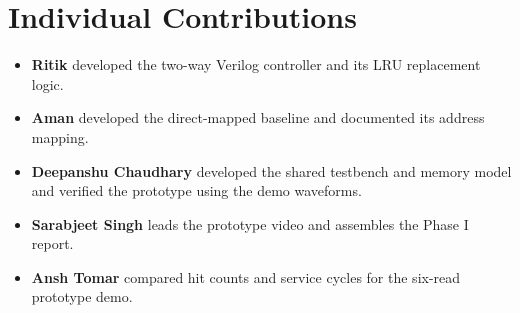 \section{Individual Contributions}
\begin{itemize}
\item \textbf{Ritik} developed the two-way Verilog controller and its LRU
replacement logic.
\item \textbf{Aman} developed the direct-mapped baseline and documented
its address mapping.
\item \textbf{Deepanshu Chaudhary} developed the shared testbench and memory model
and verified the prototype using the demo waveforms.
\item \textbf{Sarabjeet Singh} leads the prototype video and assembles the
Phase I report.
\item \textbf{Ansh Tomar} compared hit counts and service cycles
for the six-read prototype demo.
\end{itemize}



